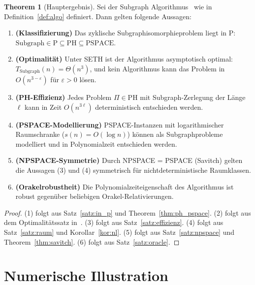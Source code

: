 ﻿\documentclass[a4paper,12pt]{article}
\theoremstyle{definition}
\newtheorem{theorem}{Theorem}
\begin{document}
\begin{theorem}[Hauptergebnis]
\label{thm:main}
  Sei der Subgraph Algorithmus~\cite{epp2026subgraph} wie in Definition~\ref{def:algo} definiert.
  Dann gelten folgende Aussagen:
  \begin{enumerate}
    \item \textbf{(Klassifizierung)} Das zyklische Subgraphisomorphieproblem liegt in P:
          $\mathrm{Subgraph} \in \mathrm{P} \subseteq \mathrm{PH} \subseteq \mathrm{PSPACE}$.
    \item \textbf{(Optimalität)} Unter SETH ist der Algorithmus asymptotisch optimal:
          $T_{\mathrm{Subgraph}}(n) = \Theta(n^3)$, und kein Algorithmus kann
          das Problem in $O(n^{3-\varepsilon})$ für $\varepsilon > 0$ lösen.
    \item \textbf{(PH-Effizienz)} Jedes Problem $\Pi \in \mathrm{PH}$ mit
          Subgraph-Zerlegung der Länge $\ell$ kann in Zeit $O(n^{3\ell})$
          deterministisch entschieden werden.
    \item \textbf{(PSPACE-Modellierung)} PSPACE-Instanzen mit logarithmischer
          Raumschranke ($s(n) = O(\log n)$) können als Subgraphprobleme modelliert
          und in Polynomialzeit entschieden werden.
    \item \textbf{(NPSPACE-Symmetrie)} Durch NPSPACE = PSPACE (Savitch) gelten
          die Aussagen (3) und (4) symmetrisch für nichtdeterministische Raumklassen.
    \item \textbf{(Orakelrobustheit)} Die Polynomialzeiteigenschaft des Algorithmus
          ist robust gegenüber beliebigen Orakel-Relativierungen.
  \end{enumerate}
\end{theorem}

\begin{proof}
  (1) folgt aus Satz~\ref{satz:in_p} und Theorem~\ref{thm:ph_pspace}.
  (2) folgt aus dem Optimalitätssatz in~\cite{epp2026subgraph}.
  (3) folgt aus Satz~\ref{satz:effizienz}.
  (4) folgt aus Satz~\ref{satz:raum} und Korollar~\ref{kor:nl}.
  (5) folgt aus Satz~\ref{satz:npspace} und Theorem~\ref{thm:savitch}.
  (6) folgt aus Satz~\ref{satz:oracle}.
\end{proof}

\section{Numerische Illustration}
\end{document}
